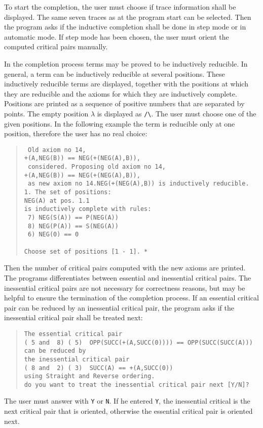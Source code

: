 \begin{itemize}
To start the completion, the user must choose if trace information shall be displayed.
The same seven traces as at the program start can be selected.
Then the program asks if the inductive completion shall be done in step 
mode or in automatic mode. If step mode has been chosen, the user must 
orient the computed critical pairs manually.

In the completion process terms may be proved to be inductively 
reducible. In general, a term can be inductively reducible at several
positions. 
These inductively reducible terms are displayed, together with the
positions at which they are reducible and the axioms for which they
are inductively complete.
Positions are printed as a sequence of positive numbers
that are separated by points. The empty position $\lambda$ is displayed 
as \verb+/\+. The user must choose one of the given positions.
In the following example the term is reducible only
at one position, therefore the user has no real choice:

\begin{quote}
\begin{verbatim} 
 Old axiom no 14,
+(A,NEG(B)) == NEG(+(NEG(A),B)),
 considered. Proposing old axiom no 14,
+(A,NEG(B)) == NEG(+(NEG(A),B)),
 as new axiom no 14.NEG(+(NEG(A),B)) is inductively reducible.
1. The set of positions: 
NEG(A) at pos. 1.1
is inductively complete with rules: 
 7) NEG(S(A)) == P(NEG(A))
 8) NEG(P(A)) == S(NEG(A))
 6) NEG(0) == 0
 
Choose set of positions [1 - 1]. *
\end{verbatim}
\end{quote}

Then the number of critical pairs computed with the new axioms are 
printed. The programs differentiates between essential and inessential
critical pairs. The inessential critical pairs are not 
necessary for correctness reasons, but may be helpful to ensure the 
termination of the completion process.
If an essential critical pair can be reduced by an inessential critical
pair, the program asks if the inessential critical pair shall be treated next:

\begin{quote}
\begin{verbatim}
The essential critical pair
( 5 and  8) ( 5)  OPP(SUCC(+(A,SUCC(0)))) == OPP(SUCC(SUCC(A)))
can be reduced by 
the inessential critical pair
( 8 and  2) ( 3)  SUCC(A) == +(A,SUCC(0))
using Straight and Reverse ordering.
do you want to treat the inessential critical pair next [Y/N]?
\end{verbatim}
\end{quote}
The user must answer with {\tt Y} or {\tt N}. If he entered {\tt Y}, the
inessential critical is the next critical pair that is oriented,
otherwise the essential critical pair is oriented next.


\end{itemize}
